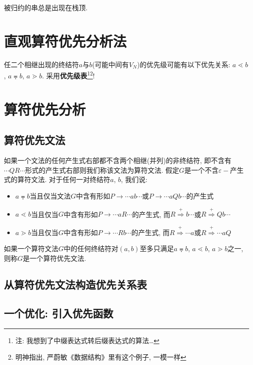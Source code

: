         被归约的串总是出现在栈顶.

    \section{直观算符优先分析法}

        任二个相继出现的终结符$a$与$b$(可能中间有$V_N$)的优先级可能有以下优先关系: $a\lessdot b$, $a\eqdot b$, $a\gtrdot b$. 采用\textbf{优先级表}\footnote{注: 我想到了中缀表达式转后缀表达式的算法\ldots}\footnote{明神指出, 严蔚敏《数据结构》里有这个例子, 一模一样}!

    \section{算符优先分析}

        \subsection{算符优先文法}

            如果一个文法的任何产生式右部都不含两个相继(并列)的非终结符, 即不含有$\cdots QR\cdots$形式的产生式右部则我们称该文法为\textsf{算符文法}. 假定$G$是一个不含$\varepsilon-$产生式的算符文法. 对于任何一对终结符$a$, $b$, 我们说: 
            \begin{itemize}
                \item $a\eqdot b$当且仅当文法$G$中含有形如$P\to \cdots ab\cdots$或$P\to \cdots aQb\cdots$的产生式
                \item $a\lessdot b$当且仅当$G$中含有形如$P\to \cdots aR\cdots$的产生式, 而$R\stackrel{+}{\Rightarrow}b\cdots$或$R\stackrel{+}{\Rightarrow}Qb\cdots$
                \item $a\gtrdot b$当且仅当$G$中含有形如$P\to \cdots Rb\cdots$的产生式, 而$R\stackrel{+}{\Rightarrow}\cdots a$或$R\stackrel{+}{\Rightarrow}\cdots aQ$
            \end{itemize}
            如果一个算符文法$G$中的任何终结符对$(a,b)$至多只满足$a\eqdot b$, $a\lessdot b$, $a\gtrdot b$之一, 则称$G$是一个\textsf{算符优先文法}.

        \subsection{从算符优先文法构造优先关系表}

            

        \subsection{一个优化: 引入优先函数}


